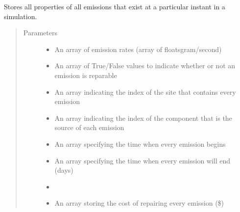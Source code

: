 \documentclass[letterpaper,10pt,english]{sphinxmanual}
\begin{document}
\begin{fulllineitems}
\label{\detokenize{index:feast.EmissionSimModules.emission_class_functions.Emission}}
Stores all properties of all emissions that exist at a particular instant in a simulation.
\begin{quote}\begin{description}
\item[{Parameters}] \leavevmode\begin{itemize}
\item {} 
 \textendash{} An array of emission rates (array of floats\textendash{}gram/second)

\item {} 
 \textendash{} An array of True/False values to indicate whether or not an emission is reparable

\item {} 
 \textendash{} An array indicating the index of the site that contains every emission

\item {} 
 \textendash{} An array indicating the index of the component that is the source of each emission

\item {} 
 \textendash{} An array specifying the time when every emission begins

\item {} 
 \textendash{} An array specifying the time when every emission will end (days)

\item {} 
 \textendash{} 

\item {} 
 \textendash{} An array storing the cost of repairing every emission (\$)

\end{itemize}

\end{description}\end{quote}

\end{fulllineitems}
\end{document}
